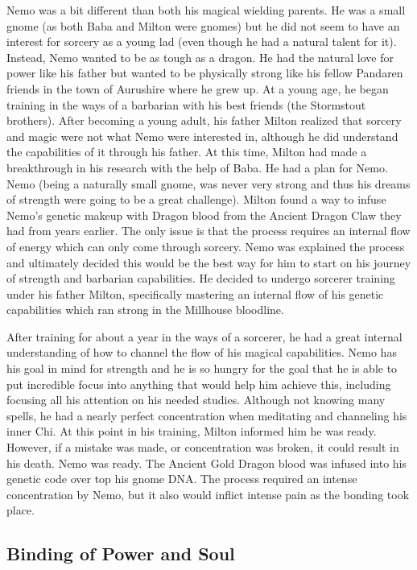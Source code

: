\documentclass[letterpaper,10pt,twoside,twocolumn,openany]{book}
\begin{document}
Nemo was a bit different than both his magical wielding parents. He was a small gnome (as both Baba and Milton were gnomes) but he did not seem to have an interest for sorcery as a young lad (even though he had a natural talent for it). Instead, Nemo wanted to be as tough as a dragon. He had the natural love for power like his father but wanted to be physically strong like his fellow Pandaren friends in the town of Aurushire where he grew up. At a young age, he began training in the ways of a barbarian with his best friends (the Stormstout brothers). After becoming a young adult, his father Milton realized that sorcery and magic were not what Nemo were interested in, although he did understand the capabilities of it through his father. At this time, Milton had made a breakthrough in his research with the help of Baba. He had a plan for Nemo. Nemo (being a naturally small gnome, was never very strong and thus his dreams of strength were going to be a great challenge). Milton found a way to infuse Nemo's genetic makeup with Dragon blood from the Ancient Dragon Claw they had from years earlier. The only issue is that the process requires an internal flow of energy which can only come through sorcery. Nemo was explained the process and ultimately decided this would be the best way for him to start on his journey of strength and barbarian capabilities. He decided to undergo sorcerer training under his father Milton, specifically mastering an internal flow of his genetic capabilities which ran strong in the Millhouse bloodline.

After training for about a year in the ways of a sorcerer, he had a great internal understanding of how to channel the flow of his magical capabilities. Nemo has his goal in mind for strength and he is so hungry for the goal that he is able to put incredible focus into anything that would help him achieve this, including focusing all his attention on his needed studies. Although not knowing many spells, he had a nearly perfect concentration when meditating and channeling his inner Chi. At this point in his training, Milton informed him he was ready. However, if a mistake was made, or concentration was broken, it could result in his death. Nemo was ready. The Ancient Gold Dragon blood was infused into his genetic code over top his gnome DNA. The process required an intense concentration by Nemo, but it also would inflict intense pain as the bonding took place.

\subsection{Binding of Power and Soul}
\end{document}
